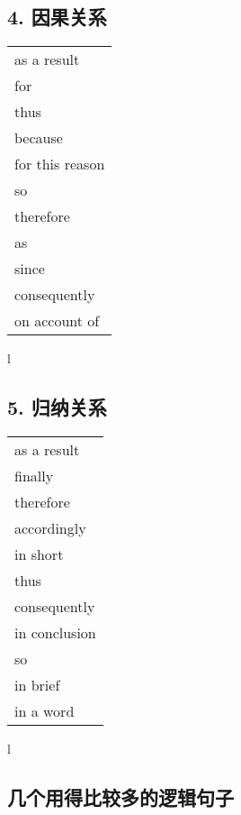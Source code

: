 \subsection{4. 因果关系}

\begin{tabular}{l}
    as a result     \\
    for             \\
    thus            \\
    because         \\
    for this reason \\
    so              \\
    therefore       \\
    as              \\
    since           \\
    consequently    \\
    on account of   \\
\end{tabular}{l}

\subsection{5. 归纳关系}

\begin{tabular}{l}
    as a result   \\
    finally       \\
    therefore     \\
    accordingly   \\
    in short      \\
    thus          \\
    consequently  \\
    in conclusion \\
    so            \\
    in brief      \\
    in a word     \\
\end{tabular}{l}

\subsection{几个用得比较多的逻辑句子}

